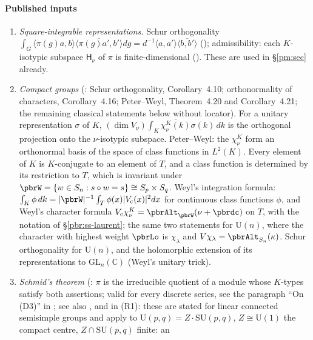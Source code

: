 \documentclass[10pt]{amsart}
\theoremstyle{definition}
\theoremstyle{remark}
\newcommand{\C}{\mathbb C}
\providecommand{\auU}{\mathrm U}
\providecommand{\aubar}[1]{\overline{#1}}
\begin{document}
\paragraph*{Published inputs}\label{pbr:ss-inputs}
\begin{enumerate}
\item[(R1)] \emph{Square-integrable representations.} Schur orthogonality $\int_G\langle\pi(g)a,b
\rangle\aubar{\langle\pi(g)a',b'\rangle}dg=d^{-1}\langle a,a'\rangle\aubar{\langle b,b'\rangle}$
(\cite[Proposition~9.6, p.~284]{Knapp}); admissibility: each $K$-isotypic subspace $\mathsf H_\nu$ of $\pi$ is
finite-dimensional (\cite[Theorem~8.1, p.~205]{Knapp}). These are used in \S\ref{pm:sec} already.
\item[(R2)] \emph{Compact groups} (\cite{KnappBeyond}: Schur orthogonality, Corollary~4.10; orthonormality of characters, Corollary~4.16; Peter--Weyl, Theorem~4.20 and Corollary~4.21; the remaining classical statements below without locator). For a
unitary representation $\sigma$ of $K$, $(\dim V_\nu)\int_K\aubar{\chi^K_\nu(k)}\sigma(k)\,dk$ is the
orthogonal projection onto the $\nu$-isotypic subspace. Peter--Weyl: the $\chi^K_\nu$ form an
orthonormal basis of the space of class functions in $L^2(K)$. Every element of $K$ is
$K$-conjugate to an element of $T$, and a class function is determined by its restriction to $T$,
which is invariant under $\pbrW=\{w\in S_n:s\circ w=s\}\cong S_p\times S_q$. Weyl's integration
formula: $\int_K\phi\,dk=|\pbrW|^{-1}\int_T\phi(x)|V_{\mathrm c}(x)|^2dx$ for continuous class
functions $\phi$, and Weyl's character formula $V_{\mathrm c}\chi^K_\nu=\pbrAlt_{\pbrW}(\nu+\pbrdc)$
on $T$, with the notation of \S\ref{pbr:ss-laurent}; the same two statements for $\auU(n)$, where the
character with highest weight $\pbrLo$ is $\chi_\lambda$ and $V\chi_\lambda=\pbrAlt_{S_n}(\kappa)$.
Schur orthogonality for $\auU(n)$, and the holomorphic extension of its representations to
$\mathrm{GL}_n(\C)$ (Weyl's unitary trick).
\item[(R3)] \emph{Schmid's theorem} (\cite[Lemma~(2.22), Lemma~(3.8), Corollary~(3.9), Corollary~(4.19) and the proof of Theorem~(1.3) on p.~560]{Schmid75}: $\pi$ is the irreducible quotient of a module whose $K$-types satisfy both assertions; valid for every discrete series, see the paragraph ``On (D3)'' in {\cite[\S3.1.3]{P49}}; see also
\cite[Theorem~9.20(b),(c), p.~310]{Knapp}, and \cite[Proposition~9.6, Theorem~8.1]{Knapp} in (R1): these are stated for linear connected semisimple groups and apply to
$\auU(p,q)=Z\cdot\mathrm{SU}(p,q)$, $Z\cong\auU(1)$ the compact centre, $Z\cap\mathrm{SU}(p,q)$ finite: an

\end{enumerate}
\end{document}
